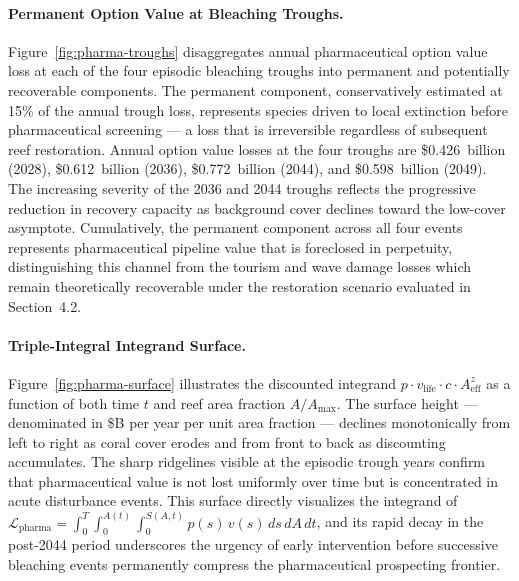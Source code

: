 \documentclass[10pt,letterpaper]{article}
\begin{document}
\paragraph{Permanent Option Value at Bleaching Troughs.}
Figure~\ref{fig:pharma-troughs} disaggregates annual pharmaceutical option value loss at each of the four episodic bleaching troughs into permanent and potentially recoverable components. The permanent component, conservatively estimated at 15\% of the annual trough loss, represents species driven to local extinction before pharmaceutical screening --- a loss that is irreversible regardless of subsequent reef restoration. Annual option value losses at the four troughs are \$0.426~billion (2028), \$0.612~billion (2036), \$0.772~billion (2044), and \$0.598~billion (2049). The increasing severity of the 2036 and 2044 troughs reflects the progressive reduction in recovery capacity as background cover declines toward the low-cover asymptote. Cumulatively, the permanent component across all four events represents pharmaceutical pipeline value that is foreclosed in perpetuity, distinguishing this channel from the tourism and wave damage losses which remain theoretically recoverable under the restoration scenario evaluated in Section~4.2.

\paragraph{Triple-Integral Integrand Surface.}
Figure~\ref{fig:pharma-surface} illustrates the discounted integrand $p \cdot v_{\text{life}} \cdot c \cdot A_{\text{eff}}^{z}$ as a function of both time $t$ and reef area fraction $A/A_{\max}$. The surface height --- denominated in \$B per year per unit area fraction --- declines monotonically from left to right as coral cover erodes and from front to back as discounting accumulates. The sharp ridgelines visible at the episodic trough years confirm that pharmaceutical value is not lost uniformly over time but is concentrated in acute disturbance events. This surface directly visualizes the integrand of $\mathcal{L}_{\text{pharma}} = \int_0^T \int_0^{A(t)} \int_0^{S(A,t)} p(s)\,v(s)\,ds\,dA\,dt$, and its rapid decay in the post-2044 period underscores the urgency of early intervention before successive bleaching events permanently compress the pharmaceutical prospecting frontier.
\end{document}

